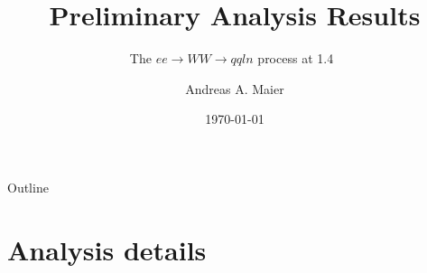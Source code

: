 \documentclass{beamer}
\title{Preliminary Analysis Results}
\subtitle{The $ee \rightarrow WW \rightarrow qqln$ process at 1.4~\TeV}
\author{Andreas A. Maier\inst{1}}
\institute[CERN] %
{
  \inst{1}%
  CERN
}
\date{\today}
\begin{document}
\begin{frame}
  \titlepage
\end{frame}






























\begin{frame}{Outline}
  \begin{multicols}{2}
    \tableofcontents
  \end{multicols}
\end{frame}









\section{Analysis details}
\end{document}
